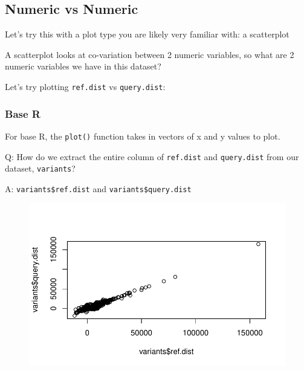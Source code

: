 \documentclass[
  letterpaper,
  DIV=11,
  numbers=noendperiod]{scrreprt}
\newenvironment{Shaded}{\begin{snugshade}}{\end{snugshade}}
\newcommand{\AttributeTok}[1]{\textcolor[rgb]{0.40,0.45,0.13}{#1}}
\newcommand{\DocumentationTok}[1]{\textcolor[rgb]{0.37,0.37,0.37}{\textit{#1}}}
\newcommand{\FunctionTok}[1]{\textcolor[rgb]{0.28,0.35,0.67}{#1}}
\newcommand{\NormalTok}[1]{\textcolor[rgb]{0.00,0.23,0.31}{#1}}
\newcommand{\SpecialCharTok}[1]{\textcolor[rgb]{0.37,0.37,0.37}{#1}}
\begin{document}
\hypertarget{numeric-vs-numeric}{%
\subsection{Numeric vs Numeric}\label{numeric-vs-numeric}}

Let's try this with a plot type you are likely very familiar with: a
scatterplot

A scatterplot looks at co-variation between 2 numeric variables, so what
are 2 numeric variables we have in this dataset?

Let's try plotting \texttt{ref.dist} vs \texttt{query.dist}:

\hypertarget{base-r}{%
\subsubsection{Base R}\label{base-r}}

For base R, the \texttt{plot()} function takes in vectors of x and y
values to plot.

Q: How do we extract the entire column of \texttt{ref.dist} and
\texttt{query.dist} from our dataset, \texttt{variants}?

A: \texttt{variants\$ref.dist} and \texttt{variants\$query.dist}

\begin{Shaded}
\end{Shaded}

\begin{figure}[H]

{\centering \includegraphics{scripts/02_dataViz/class3_files/figure-pdf/unnamed-chunk-3-1.pdf}

}

\end{figure}
\end{document}
